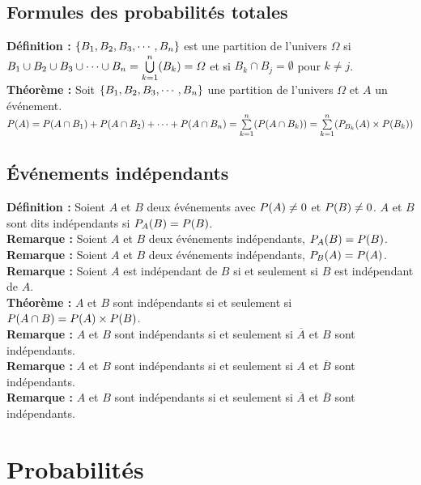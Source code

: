 \documentclass[a4paper,titlepage]{article}
\let\oldsection\section
\renewcommand\section{\clearpage\oldsection}
\let\oldleft\left
\renewcommand{\left}{\mathopen{}\mathclose\bgroup\oldleft}
\let\oldright\right
\renewcommand{\right}{\aftergroup\egroup\oldright}
\begin{document}
    \subsection{Formules des probabilités totales}
        \textbf{Définition :} $\left\{B_{1},B_{2},B_{3},\cdots,B_{n}\right\}$ est une partition de l’univers $\varOmega$ si $B_{1}\cup B_{2}\cup B_{3}\cup\cdots\cup B_{n}=\bigcup\limits_{k=1}^{n}\left(B_{k}\right)=\varOmega$ et si $B_{k}\cap B_{j}=\emptyset$ pour $k\neq j$.
        \\
        \textbf{Théorème :} Soit $\left\{B_{1},B_{2},B_{3},\cdots,B_{n}\right\}$ une partition de l’univers $\varOmega$ et $A$ un événement.\linebreak$P\left(A\right)=P\left(A\cap B_{1}\right)+P\left(A\cap B_{2}\right)+\cdots+P\left(A\cap B_{n}\right)=\sum\limits_{k=1}^{n}\left(P\left(A\cap B_{k}\right)\right)=\sum\limits_{k=1}^{n}\left(P_{B_{k}}\left(A\right)\times P\left( B_{k}\right)\right)$
    \subsection{Événements indépendants}
        \textbf{Définition :} Soient $A$ et $B$ deux événements avec $P\left(A\right)\neq0$ et $P\left(B\right)\neq0$. $A$ et $B$ sont dits indépendants si $P_{A}\left(B\right)=P\left(B\right)$.
        \\
        \textbf{Remarque :} Soient $A$ et $B$ deux événements indépendants, $P_{A}\left(B\right)=P\left(B\right)$.
        \\
        \textbf{Remarque :} Soient $A$ et $B$ deux événements indépendants, $P_{B}\left(A\right)=P\left(A\right)$.
        \\
        \textbf{Remarque :} Soient $A$ est indépendant de $B$ si et seulement si $B$ est indépendant de $A$.
        \\
        \textbf{Théorème :} $A$ et $B$ sont indépendants si et seulement si $P\left(A\cap B\right)=P\left(A\right)\times P\left(B\right)$.
        \\
        \textbf{Remarque :} $A$ et $B$ sont indépendants si et seulement si $\overline{A}$ et $B$ sont indépendants.
        \\
        \textbf{Remarque :} $A$ et $B$ sont indépendants si et seulement si $A$ et $\overline{B}$ sont indépendants.
        \\
        \textbf{Remarque :} $A$ et $B$ sont indépendants si et seulement si $\overline{A}$ et $\overline{B}$ sont indépendants.
\section{Probabilités}
\end{document}
